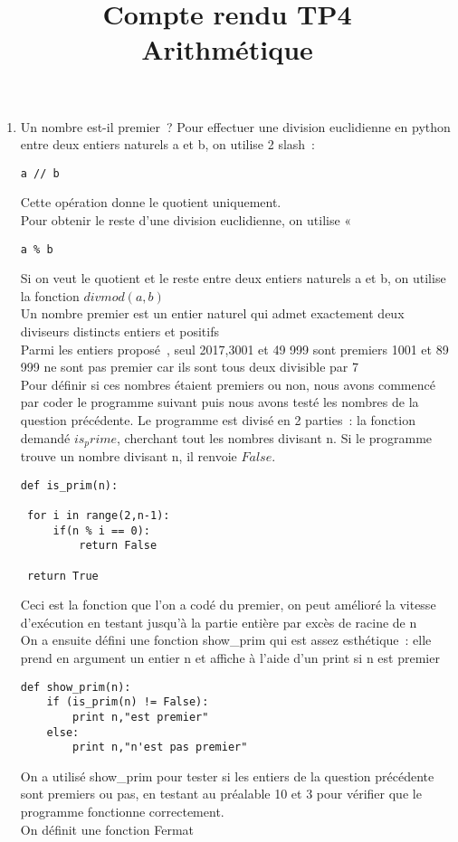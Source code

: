 \documentclass{article}
\title{Compte rendu TP4\\ Arithmétique}
\begin{document}
\maketitle



\begin{enumerate}
	\item Un nombre est-il premier ?
Pour effectuer une division euclidienne en python entre deux entiers naturels
 a et b, on utilise 2 slash :

\begin{lstlisting}[basicstyle=\small]
 a // b
\end{lstlisting}

Cette opération donne le quotient uniquement. \\
Pour obtenir le reste d’une division euclidienne,
 on utilise « %

 \begin{lstlisting}[basicstyle=\small]
  a % b
 \end{lstlisting}

 Si on veut le quotient et le reste entre deux entiers naturels a et b,
  on utilise la fonction $divmod(a,b)$ \\
	Un nombre premier est un entier naturel qui admet exactement deux diviseurs
	 distincts entiers et positifs \\
Parmi les entiers proposé , seul 2017,3001 et 49 999 sont premiers
 1001 et 89 999 ne sont pas premier car ils sont tous deux divisible par 7 \\
Pour définir si ces nombres étaient premiers ou non, nous avons commencé par
coder le programme suivant puis nous avons testé les nombres de la question
 précédente. Le programme est divisé en 2 parties :
  la fonction demandé $is_prime$, cherchant tout les nombres divisant n.
	 Si le programme trouve un nombre divisant n, il renvoie $False$.

	 \begin{lstlisting}[basicstyle=\small]
	 def is_prim(n):

 for i in range(2,n-1):
	 if(n % i == 0):
		 return False

 return True
	 \end{lstlisting}

	 Ceci est la fonction que l’on a codé du premier, on peut amélioré
	  la vitesse d’exécution en testant jusqu'à la partie entière par
		excès de racine de n \\
		On a ensuite défini une fonction show_prim qui est assez esthétique : elle
		prend en argument un entier n et affiche à l’aide d’un print si n
	  est premier  \\
		\begin{lstlisting}[basicstyle=\small]
		def show_prim(n):
	if (is_prim(n) != False):
		print n,"est premier"
	else:
		print n,"n'est pas premier"
		\end{lstlisting}
On a utilisé show_prim pour tester si les entiers de la question précédente
 sont premiers ou pas, en testant au préalable 10 et 3 pour vérifier
  que le programme fonctionne correctement. \\
	On définit une fonction Fermat


\end{enumerate}
\end{document}
